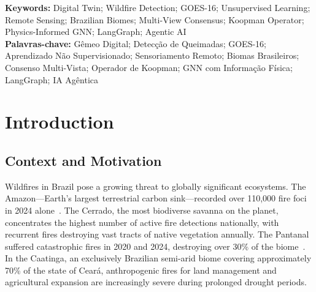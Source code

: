 \documentclass[5p,twocolumn]{elsarticle}
\begin{document}
\noindent\textbf{Keywords:} Digital Twin; Wildfire Detection; GOES-16; Unsupervised Learning; Remote Sensing; Brazilian Biomes; Multi-View Consensus; Koopman Operator; Physics-Informed GNN; LangGraph; Agentic AI \\
\textbf{Palavras-chave:} Gêmeo Digital; Detecção de Queimadas; GOES-16; Aprendizado Não Supervisionado; Sensoriamento Remoto; Biomas Brasileiros; Consenso Multi-Vista; Operador de Koopman; GNN com Informação Física; LangGraph; IA Agêntica

\section{Introduction}
\label{sec:intro}

\subsection{Context and Motivation}

Wildfires in Brazil pose a growing threat to globally significant ecosystems. The Amazon---Earth's largest terrestrial carbon sink---recorded over 110,000 fire foci in 2024 alone~\cite{inpe2025}. The Cerrado, the most biodiverse savanna on the planet, concentrates the highest number of active fire detections nationally, with recurrent fires destroying vast tracts of native vegetation annually. The Pantanal suffered catastrophic fires in 2020 and 2024, destroying over 30\% of the biome~\cite{mapbiomas2025}. In the Caatinga, an exclusively Brazilian semi-arid biome covering approximately 70\% of the state of Cear\'{a}, anthropogenic fires for land management and agricultural expansion are increasingly severe during prolonged drought periods.
\end{document}
